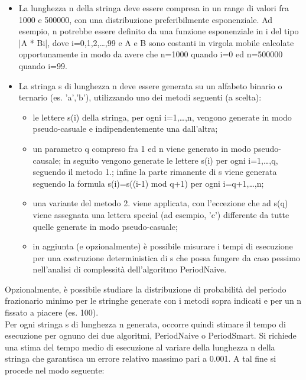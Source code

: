\begin{itemize}
    \item La lunghezza n della stringa deve essere compresa in un range di valori fra 1000 e 500000, con una distribuzione preferibilmente esponenziale. Ad esempio, n potrebbe essere definito da una funzione esponenziale in i del tipo |A * Bi|, dove i=0,1,2,…,99 e A e B sono costanti in virgola mobile calcolate opportunamente in modo da avere che n=1000 quando i=0 ed n=500000 quando i=99.
    \item La stringa s di lunghezza n deve essere generata su un alfabeto binario o ternario (es. {'a','b'}), utilizzando uno dei metodi seguenti (a scelta):
    \begin{itemize}
        \item le lettere s(i) della stringa, per ogni i=1,…,n, vengono generate in modo pseudo-casuale e indipendentemente una dall'altra;
        \item un parametro q compreso fra 1 ed n viene generato in modo pseudo-causale; in seguito vengono generate le lettere s(i) per ogni i=1,…,q, seguendo il metodo 1.; infine la parte rimanente di s viene generata seguendo la formula s(i)=s((i-1) mod q+1) per ogni i=q+1,…,n;
        \item una variante del metodo 2. viene applicata, con l'eccezione che ad s(q) viene assegnata una lettera special (ad esempio, 'c') differente da tutte quelle generate in modo pseudo-casuale;
        \item in aggiunta (e opzionalmente) è possibile misurare i tempi di esecuzione per una costruzione deterministica di s che possa fungere da caso pessimo nell'analisi di complessità dell'algoritmo PeriodNaive.
    \end{itemize}
\end{itemize}
\pagebreak
Opzionalmente, è possibile studiare la distribuzione di probabilità del periodo frazionario minimo per le stringhe generate con i metodi sopra indicati e per un n fissato a piacere (es. 100).
\vspace{3mm}\\
Per ogni stringa s di lunghezza n generata, occorre quindi stimare il tempo di esecuzione per ognuno dei due algoritmi, PeriodNaive o PeriodSmart. Si richiede una stima del tempo medio di esecuzione al variare della lunghezza n della stringa che garantisca un errore relativo massimo pari a 0.001. A tal fine si procede nel modo seguente:
